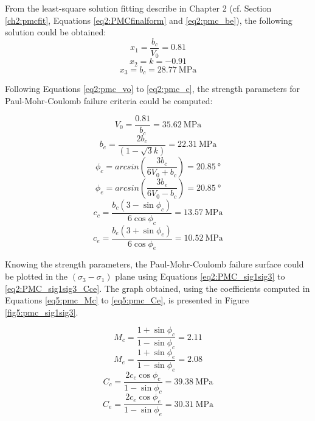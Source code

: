 From the least-square solution fitting describe in Chapter 2 (cf. Section \ref{ch2:pmcfit}, Equations \ref{eq2:PMCfinalform} and \ref{eq2:pmc_be}), the following solution could be obtained:
\begin{equation}
    x_1 = \frac{b_c}{V_0} = 0.81
\end{equation}
\begin{equation}
    x_2 = k = -0.91
\end{equation}
\begin{equation}\label{eq5:pmc_bc}
    x_3 = b_c = \SI{28.77}{\mega\pascal}
\end{equation}

Following Equations \ref{eq2:pmc_vo} to \ref{eq2:pmc_c}, the strength parameters for Paul-Mohr-Coulomb failure criteria could be computed:

\begin{equation}
    V_0 = \frac{0.81}{b_c} = \SI{35.62}{\mega\pascal}
\end{equation}
\begin{equation}\label{eq5:pmc_be}
    b_e = \frac{2b_c}{(1-\sqrt{3}k)} = \SI{22.31}{\mega\pascal}
\end{equation}
\begin{equation}
    \phi_c = arcsin\left(\frac{3b_c}{6V_0+b_c}\right) = \SI{20.85}{\degree}
\end{equation}
\begin{equation}
    \phi_e = arcsin\left(\frac{3b_e}{6V_0-b_c}\right) = \SI{20.85}{\degree}
\end{equation}
\begin{equation}
    c_{c}=\frac{b_{c}\left(3-\sin \phi_{c}\right)}{6 \cos \phi_{c}} = \SI{13.57}{\mega\pascal}
\end{equation}
\begin{equation}
    c_{e}=\frac{b_{e}\left(3+\sin \phi_{e}\right)}{6 \cos \phi_{e}} = \SI{10.52}{\mega\pascal}
\end{equation}

Knowing the strength parameters, the Paul-Mohr-Coulomb failure surface could be plotted in the $(\sigma_3-\sigma_1)$ plane using Equations \ref{eq2:PMC_sig1sig3} to \ref{eq2:PMC_sig1sig3_Cce}. The graph obtained, using the coefficients computed in Equations \ref{eq5:pmc_Mc} to \ref{eq5:pmc_Ce}, is presented in Figure \ref{fig5:pmc_sig1sig3}.

\begin{equation}\label{eq5:pmc_Mc}
    M_c = \frac{1+\sin \phi_c}{1-\sin \phi_c} = 2.11
\end{equation}
\begin{equation}
    M_e = \frac{1+\sin \phi_e}{1-\sin \phi_e} = 2.08
\end{equation}
\begin{equation}
    C_c = \frac{2c_c\cos \phi_c}{1-\sin \phi_c} = \SI{39.38}{\mega\pascal}
\end{equation}
\begin{equation}\label{eq5:pmc_Ce}
    C_e = \frac{2c_e\cos \phi_e}{1-\sin \phi_e} = \SI{30.31}{\mega\pascal}
\end{equation}

